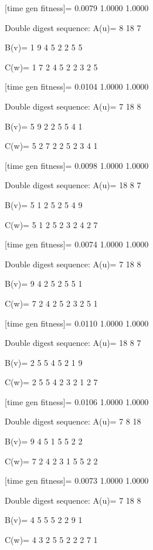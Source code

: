 [time gen fitness]=
    0.0079    1.0000    1.0000

Double digest sequence:
A(u)=
     8    18     7

B(v)=
     1     9     4     5     2     2     5     5

C(w)=
     1     7     2     4     5     2     2     3     2     5

[time gen fitness]=
    0.0104    1.0000    1.0000

Double digest sequence:
A(u)=
     7    18     8

B(v)=
     5     9     2     2     5     5     4     1

C(w)=
     5     2     7     2     2     5     2     3     4     1

[time gen fitness]=
    0.0098    1.0000    1.0000

Double digest sequence:
A(u)=
    18     8     7

B(v)=
     5     1     2     5     2     5     4     9

C(w)=
     5     1     2     5     2     3     2     4     2     7

[time gen fitness]=
    0.0074    1.0000    1.0000

Double digest sequence:
A(u)=
     7    18     8

B(v)=
     9     4     2     5     2     5     5     1

C(w)=
     7     2     4     2     5     2     3     2     5     1

[time gen fitness]=
    0.0110    1.0000    1.0000

Double digest sequence:
A(u)=
    18     8     7

B(v)=
     2     5     5     4     5     2     1     9

C(w)=
     2     5     5     4     2     3     2     1     2     7

[time gen fitness]=
    0.0106    1.0000    1.0000

Double digest sequence:
A(u)=
     7     8    18

B(v)=
     9     4     5     1     5     5     2     2

C(w)=
     7     2     4     2     3     1     5     5     2     2

[time gen fitness]=
    0.0073    1.0000    1.0000

Double digest sequence:
A(u)=
     7    18     8

B(v)=
     4     5     5     5     2     2     9     1

C(w)=
     4     3     2     5     5     2     2     2     7     1

